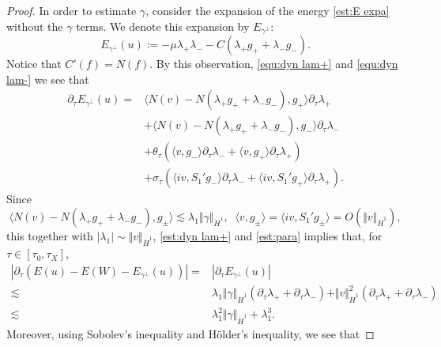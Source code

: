 \documentclass[reqno, 11pt]{amsart}
\numberwithin{equation}{section}
\theoremstyle{plain}
\theoremstyle{definition}
\numberwithin{equation}{section}
\numberwithin{theorem}{section}
\numberwithin{equation}{section}
\numberwithin{equation}{section}
\numberwithin{theorem}{section}
\begin{document}
\begin{proof}
		In order to estimate $\gamma$, consider the expansion of the energy \eqref{est:E expa} without the $\gamma$ terms. We denote this expansion by $E_{\gamma^{\bot}}$:
		\begin{equation*}
		E_{\gamma^{\perp}}(u):=-\mu\lambda_+\lambda_{-}-C(\lambda_+g_{+}+\lambda_{-}g_{-}).
		\end{equation*}
		Notice that $C'(f)=N(f)$. By this observation, \eqref{equ:dyn lam+} and \eqref{equ:dyn lam-} we see that
		\begin{equation*}
		\begin{aligned}
		\partial_{\tau}E_{\gamma^{\bot}}(u)=&\langle N(v)-N(\lambda_+g_{+}+\lambda_{-}g_{-}) ,g_{+}\rangle \partial_{\tau}\lambda_+\\& +\langle N(v)-N(\lambda_+g_{+}+\lambda_{-}g_{-}) ,g_{-}\rangle \partial_{\tau}\lambda_-\\& + \theta_{\tau}\left( \langle v,g_{-} \rangle \partial_{\tau}\lambda_- + \langle v,g_{+} \rangle \partial_{\tau}\lambda_+ \right)\\&+ \sigma_{\tau}\left( \langle iv,S_{1}'g_{-} \rangle \partial_{\tau}\lambda_- + \langle iv,S_{1}'g_{+} \rangle \partial_{\tau}\lambda_+ \right).
		\end{aligned}
		\end{equation*}
		Since 
		\begin{equation*}
		\langle N(v)-N(\lambda_+g_{+}+\lambda_{-}g_{-}) ,g_\pm\rangle\lesssim \lambda_{1}\Vert \gamma \Vert_{\dot H^1},\;\;\langle v,g_\pm \rangle=\langle iv,S_{1}'g_{\pm} \rangle=O(\Vert v \Vert_{\dot H^1}),
		\end{equation*}
		this together with $|\lambda_{1}|\sim \Vert v \Vert_{\dot H^1}$, \eqref{est:dyn lam+} and \eqref{est:para} implies that, for $\tau\in \left[ \tau_{0},\tau_{X} \right]$,
		\begin{equation}\label{est:parl uW minu}
		\begin{aligned}
		|\partial_{\tau}\left( E(u)-E(W)-E_{\gamma^{\bot}}(u) \right)|=&|\partial_{\tau}E_{\gamma^{\bot}}(u)|\\\lesssim& \lambda_{1}\Vert \gamma \Vert_{\dot H^1}\left(\partial_{\tau}\lambda_{+}+\partial_{\tau}\lambda_{-}\right) + \Vert v \Vert_{\dot H^1}^2\left(\partial_{\tau}\lambda_{+}+\partial_{\tau}\lambda_{-}\right)\\\lesssim&\lambda_{1}^{2}	\Vert \gamma \Vert_{\dot H^1} +\lambda_{1}^{3}.
		\end{aligned}
		\end{equation}
		Moreover, using Sobolev's inequality and Hölder's inequality, we see that

\end{proof}
\end{document}
